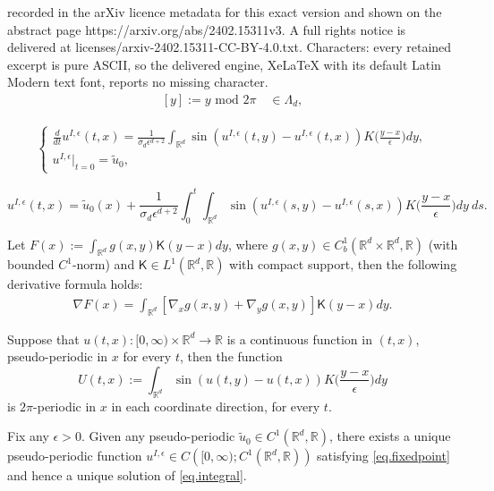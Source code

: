 \documentclass[10pt,a4paper]{amsart}
\newcommand{\R}{\mathbb{R}}
\newcommand{\ep}{\epsilon}
\newcommand{\red}[1]{{#1}}
\begin{document}
recorded in the arXiv licence metadata for this exact version and shown on the abstract page https://arxiv.org/abs/2402.15311v3. A full rights notice is delivered at licenses/arxiv-2402.15311-CC-BY-4.0.txt. Characters: every retained excerpt is pure ASCII, so the delivered engine, XeLaTeX with its default Latin Modern text font, reports no missing character.
\begin{align}\label{def:mod}
[y]:=y \text{ mod }2\pi \quad\in\Lambda_d,
\end{align}

\begin{eqnarray}\label{eq.integral}
\begin{cases}
\displaystyle{\frac{d}{dt}}u^{I,\ep}(t,x)=\frac{1}{\sigma_d\ep^{d+2}}\int_{\red{\R^d}}\sin\left(u^{I,\ep}(t,y)-u^{I,\ep}(t,x)\right)K\Big(\frac{y-x}{\ep}\Big)dy, \label{eq:int}\\[10pt]
u^{I,\ep}|_{t=0}=\red{\tilde u_0,}
\end{cases}
\end{eqnarray}

\begin{equation}\label{eq.fixedpoint}
u^{I,\ep}(t,x) =\tilde u_0(x) + \frac{1}{\sigma_d\ep^{d+2}}\int_0^t\int_{\red{\R^d}}\sin\left(u^{I,\ep}(s,y) - u^{I,\ep}(s,x)\right)K\Big(\frac{y-x}{\ep}\Big)dy\:ds.
\end{equation}

\begin{lemma}\label{lem:derivative}
Let $F(x):=\int_{\red{\R^d}}g(x,y)\mathsf K(y-x)dy$, where 
$g(x,y)\in C^1_b(\R^d\times\R^d,\R)$ \red{(with bounded $C^1$-norm)} and $\mathsf K\in L^1(\R^d,\R)$ with compact support, then the following derivative formula holds:
\begin{align*}
\nabla F(x)=\int_{\red{\R^d}}\left[\nabla_x g(x,y)+\nabla_yg(x,y) \right] \mathsf K(y-x) dy.
\end{align*}
\end{lemma}

\begin{lemma}\label{lem:periodic}
Suppose that $u(t,x):[0,\infty)\times\R^d\to\R$ is a continuous function in $(t,x)$, pseudo-periodic in $x$ for every $t$, then the function
\[
U(t,x):=\int_{\R^d}\sin\left(u(t,y) - u(t,x)\right)K\Big(\frac{y-x}{\ep}\Big)dy
\]
is $2\pi$-periodic in $x$ in each coordinate direction, for every $t$.
\end{lemma}

\begin{proposition}\label{prop.existence}
Fix any $\ep>0$. Given \red{any pseudo-periodic $\tilde u_0\in C^1(\R^d,\R)$}, there exists a unique \red{pseudo-periodic function $u^{I,\ep}\in C\left([0,\infty);C^1(\R^d,\R)\right)$} satisfying \eqref{eq.fixedpoint} and hence a unique solution of \eqref{eq.integral}.
\end{proposition}
\end{document}
